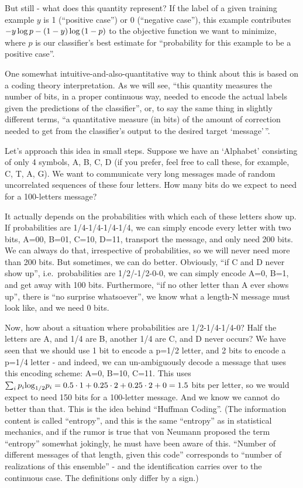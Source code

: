 \documentclass[11pt]{article}
\begin{document}
But still - what does this quantity represent? If the label of a given
training example \(y\) is 1 (``positive case'') or 0 (``negative
case''), this example contributes
\(-y\,{\rm log}\,p-(1-y)\,{\rm log}\,(1-p)\) to the objective function
we want to minimize, where \(p\) is our classifier's best estimate for
``probability for this example to be a positive case''.

One somewhat intuitive-and-also-quantitative way to think about this is
based on a coding theory interpretation. As we will see, ``this quantity
measures the number of bits, in a proper continuous way, needed to
encode the actual labels given the predictions of the classifier'', or,
to say the same thing in slightly different terms, ``a quantitative
measure (in bits) of the amount of correction needed to get from the
classifier's output to the desired target `message'\,''.

Let's approach this idea in small steps. Suppose we have an `Alphabet'
consisting of only 4 symbols, A, B, C, D (if you prefer, feel free to
call these, for example, C, T, A, G). We want to communicate very long
messages made of random uncorrelated sequences of these four letters.
How many bits do we expect to need for a 100-letters message?

It actually depends on the probabilities with which each of these
letters show up. If probabilities are 1/4-1/4-1/4-1/4, we can simply
encode every letter with two bits, A=00, B=01, C=10, D=11, transport the
message, and only need 200 bits. We can always do that, irrespective of
probabilities, so we will never need more than 200 bits. But sometimes,
we can do better. Obviously, ``if C and D never show up'',
i.e.~probabilities are 1/2/-1/2-0-0, we can simply encode A=0, B=1, and
get away with 100 bits. Furthermore, ``if no other letter than A ever
shows up'', there is ``no surprise whatsoever'', we know what a length-N
message must look like, and we need 0 bits.

Now, how about a situation where probabilities are 1/2-1/4-1/4-0? Half
the letters are A, and 1/4 are B, another 1/4 are C, and D never occurs?
We have seen that we should use 1 bit to encode a p=1/2 letter, and 2
bits to encode a p=1/4 letter - and indeed, we can un-ambiguously decode
a message that uses this encoding scheme: A=0, B=10, C=11. This uses
\(\sum_i p_i {\rm log}_{1/2} p_i = 0.5\cdot 1+0.25\cdot 2+0.25\cdot 2+0=1.5\)
bits per letter, so we would expect to need 150 bits for a 100-letter
message. And we know we cannot do better than that. This is the idea
behind ``Huffman Coding''. (The information content is called
``entropy'', and this is the same ``entropy'' as in statistical
mechanics, and if the rumor is true that von Neumann proposed the term
``entropy'' somewhat jokingly, he must have been aware of this. ``Number
of different messages of that length, given this code'' corresponds to
``number of realizations of this ensemble'' - and the identification
carries over to the continuous case. The definitions only differ by a
sign.)
\end{document}
